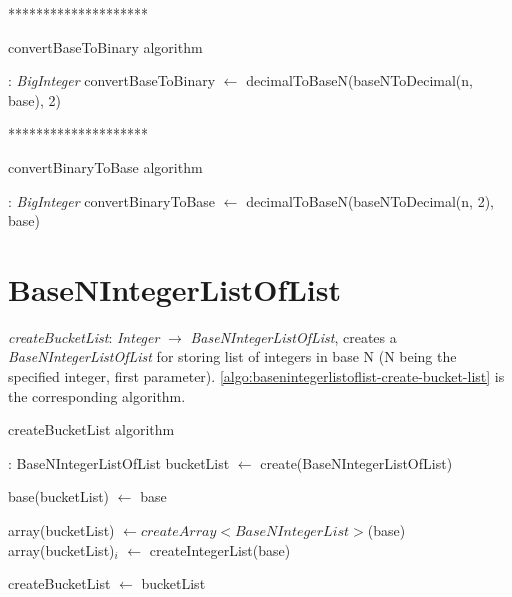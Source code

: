 \documentclass[book, nodocumentinfo]{upmethodology-document}
\newcommand{\separator}{\centerline{********************}}
\begin{document}
\separator

\begin{algorithm}[H]
    \caption{convertBaseToBinary algorithm}
    \label{algo:basenintegerlist-convert-base-to-binary}

    \begin{algorithmic}
         : \emph{BigInteger}
            \State convertBaseToBinary \(\leftarrow\) decimalToBaseN(baseNToDecimal(n, base), 2)
        \EndFunction
    \end{algorithmic}
\end{algorithm}

\separator

\begin{algorithm}[H]
    \caption{convertBinaryToBase algorithm}
    \label{algo:basenintegerlist-convert-binary-to-base}

    \begin{algorithmic}
         : \emph{BigInteger}
            \State convertBinaryToBase \(\leftarrow\) decimalToBaseN(baseNToDecimal(n, 2), base)
        \EndFunction
    \end{algorithmic}
\end{algorithm}

\section{BaseNIntegerListOfList}

\emph{createBucketList}: \emph{Integer} \(\rightarrow\) \emph{BaseNIntegerListOfList},
creates a \emph{BaseNIntegerListOfList} for storing list of integers in base N (N being the specified integer, first parameter).
\ref{algo:basenintegerlistoflist-create-bucket-list} is the corresponding algorithm.

\begin{algorithm}[H]
    \caption{createBucketList algorithm}
    \label{algo:basenintegerlistoflist-create-bucket-list}

    \begin{algorithmic}
         : BaseNIntegerListOfList
            \State bucketList \(\leftarrow\) create(BaseNIntegerListOfList)

            \State base(bucketList) \(\leftarrow\) base

            \State array(bucketList) \(\leftarrow createArray<BaseNIntegerList>\)(base)
                \State array(bucketList)\(_i\) \(\leftarrow\) createIntegerList(base)
            \EndFor

            \State createBucketList \(\leftarrow\) bucketList
        \EndFunction
    \end{algorithmic}
\end{algorithm}
\end{document}

